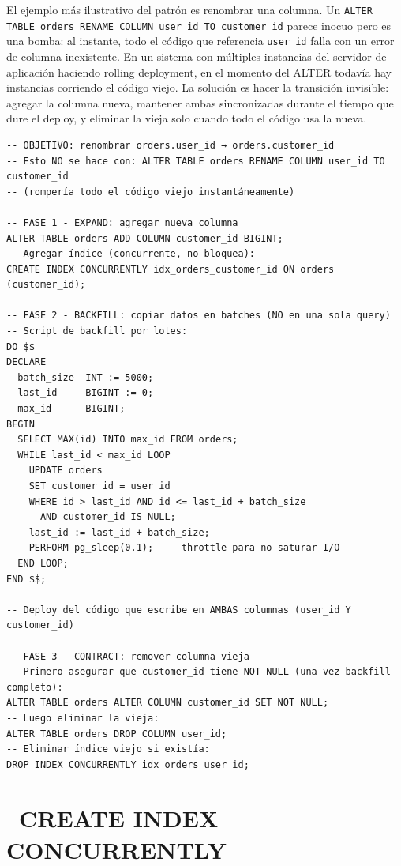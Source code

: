 El ejemplo más ilustrativo del patrón es renombrar una columna.
Un \texttt{ALTER TABLE orders RENAME COLUMN user\_id TO customer\_id} parece inocuo pero es una bomba: al instante, todo el código que referencia \texttt{user\_id} falla con un error de columna inexistente.
En un sistema con múltiples instancias del servidor de aplicación haciendo rolling deployment, en el momento del ALTER todavía hay instancias corriendo el código viejo.
La solución es hacer la transición invisible: agregar la columna nueva, mantener ambas sincronizadas durante el tiempo que dure el deploy, y eliminar la vieja solo cuando todo el código usa la nueva.

\begin{lstlisting}[caption={Expand-Contract: renombrar columna (ejemplo real)}]
-- OBJETIVO: renombrar orders.user_id → orders.customer_id
-- Esto NO se hace con: ALTER TABLE orders RENAME COLUMN user_id TO customer_id
-- (rompería todo el código viejo instantáneamente)

-- FASE 1 - EXPAND: agregar nueva columna
ALTER TABLE orders ADD COLUMN customer_id BIGINT;
-- Agregar índice (concurrente, no bloquea):
CREATE INDEX CONCURRENTLY idx_orders_customer_id ON orders (customer_id);

-- FASE 2 - BACKFILL: copiar datos en batches (NO en una sola query)
-- Script de backfill por lotes:
DO $$
DECLARE
  batch_size  INT := 5000;
  last_id     BIGINT := 0;
  max_id      BIGINT;
BEGIN
  SELECT MAX(id) INTO max_id FROM orders;
  WHILE last_id < max_id LOOP
    UPDATE orders
    SET customer_id = user_id
    WHERE id > last_id AND id <= last_id + batch_size
      AND customer_id IS NULL;
    last_id := last_id + batch_size;
    PERFORM pg_sleep(0.1);  -- throttle para no saturar I/O
  END LOOP;
END $$;

-- Deploy del código que escribe en AMBAS columnas (user_id Y customer_id)

-- FASE 3 - CONTRACT: remover columna vieja
-- Primero asegurar que customer_id tiene NOT NULL (una vez backfill completo):
ALTER TABLE orders ALTER COLUMN customer_id SET NOT NULL;
-- Luego eliminar la vieja:
ALTER TABLE orders DROP COLUMN user_id;
-- Eliminar índice viejo si existía:
DROP INDEX CONCURRENTLY idx_orders_user_id;
\end{lstlisting}

\section[CREATE INDEX CONCURRENTLY]{~CREATE INDEX CONCURRENTLY}

